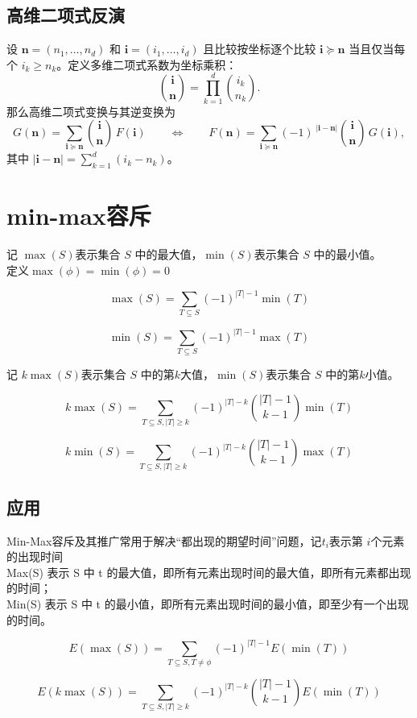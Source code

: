 \subsection{高维二项式反演}

\begin{theorem}
  设 $\mathbf{n}=(n_1,\dots,n_d)$ 和 $ \mathbf{i}=(i_1,\dots,i_d)$ 且比较按坐标逐个比较 $\mathbf{i}\succeq\mathbf{n}$ 当且仅当每个 $i_k\ge n_k$。定义多维二项式系数为坐标乘积：
$$
\binom{\mathbf{i}}{\mathbf{n}}=\prod_{k=1}^d \binom{i_k}{n_k}.
$$
那么高维二项式变换与其逆变换为
$$
G(\mathbf{n})=\sum_{\mathbf{i}\succeq\mathbf{n}}\binom{\mathbf{i}}{\mathbf{n}}\,F(\mathbf{i})
\qquad\Longleftrightarrow\qquad
F(\mathbf{n})=\sum_{\mathbf{i}\succeq\mathbf{n}}(-1)^{\;|\mathbf{i}-\mathbf{n}|}\binom{\mathbf{i}}{\mathbf{n}}\,G(\mathbf{i}),
$$
其中 $|\mathbf{i}-\mathbf{n}|=\sum_{k=1}^d (i_k-n_k)$。
\end{theorem}

\section{min-max容斥}
记 $\max(S)$表示集合 $S$ 中的最大值，$\min(S)$表示集合 $S$ 中的最小值。\\
定义$\max(\phi)=\min (\phi)=0$\\
\begin{theorem}
  \[
\max(S)=\sum_{T \subseteq S }(-1)^{|T|-1} \min(T)
\]

$$
\min(S)=\sum_{T\subseteq S} (-1)^{|T|-1} \max(T)
$$
\end{theorem}

记 $k \max(S)$表示集合 $S$ 中的第$k$大值，$\min(S)$表示集合 $S$ 中的第$k$小值。

\begin{theorem}
  $$
k\max(S)=\sum_{T\subseteq S,|T|\ge k} (-1)^{|T|-k}\binom{|T|-1}{k-1}\min(T)
$$

$$
k \min(S)=\sum_{T\subseteq S,|T| \ge k} (-1)^{|T|-k} \binom{|T|-1}{k-1} \max(T)
$$
\end{theorem}

\subsection{应用}
Min-Max容斥及其推广常用于解决“都出现的期望时间”问题，记$t_i$表示第 $i$个元素的出现时间\\
Max(S) 表示 S 中 t 的最大值，即所有元素出现时间的最大值，即所有元素都出现的时间；\\
Min(S) 表示 S 中 t 的最小值，即所有元素出现时间的最小值，即至少有一个出现的时间。\\
\begin{proposition}
  $$
E(\max(S))=\sum_{T\subseteq S,T\neq \phi} (-1)^{|T|-1}E(\min(T))
$$

$$
E(k\max(S))=\sum_{T\subseteq S,|T|\ge k}(-1)^{|T|-k}\binom{|T|-1}{k-1} E(\min(T))
$$
\end{proposition}

